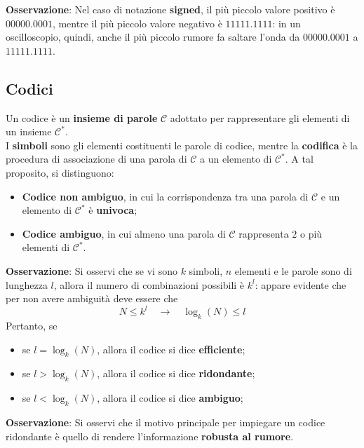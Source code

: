 \documentclass[a4paper]{extarticle}
\begin{document}
\vspace{1em}
\noindent
\textbf{Osservazione}: Nel caso di notazione \textbf{signed}, il più piccolo valore positivo è $00000.0001$, mentre il più piccolo valore negativo è $11111.1111$: in un oscilloscopio, quindi, anche il più piccolo rumore fa saltare l'onda da $00000.0001$ a $11111.1111$.

\vspace{1em}
\subsection{Codici}
Un codice è un \textbf{insieme di parole} $\mathcal{C}$ adottato per rappresentare gli elementi di un insieme $\mathcal{C}^*$.\\
I \textbf{simboli} sono gli elementi costituenti le parole di codice, mentre la \textbf{codifica} è la procedura di associazione di una parola di $\mathcal{C}$ a un elemento di $\mathcal{C}^*$. A tal proposito, si distinguono:
\begin{itemize}
    \item \textbf{Codice non ambiguo}, in cui la corrispondenza tra una parola di $\mathcal{C}$ e un elemento di $\mathcal{C}^*$ è \textbf{univoca};
    \item \textbf{Codice ambiguo}, in cui almeno una parola di $\mathcal{C}$ rappresenta $2$ o più elementi di $\mathcal{C}^*$.
\end{itemize}

\vspace{1em}
\noindent
\textbf{Osservazione}: Si osservi che se vi sono $k$ simboli, $n$ elementi e le parole sono di lunghezza $l$, allora il numero di combinazioni possibili è $k^l$: appare evidente che per non avere ambiguità deve essere che
\[N \leq k^l \hspace{1em} \rightarrow \hspace{1em} \log_k(N) \leq l\]
Pertanto, se
\begin{itemize}
    \item se $l=\log_k(N)$, allora il codice si dice \textbf{efficiente};
    \item se $l>\log_k(N)$, allora il codice si dice \textbf{ridondante};
    \item se $l<\log_k(N)$, allora il codice si dice \textbf{ambiguo};
\end{itemize}

\vspace{1em}
\noindent
\textbf{Osservazione}: Si osservi che il motivo principale per impiegare un codice ridondante è quello di rendere l'informazione \textbf{robusta al rumore}.
\end{document}
